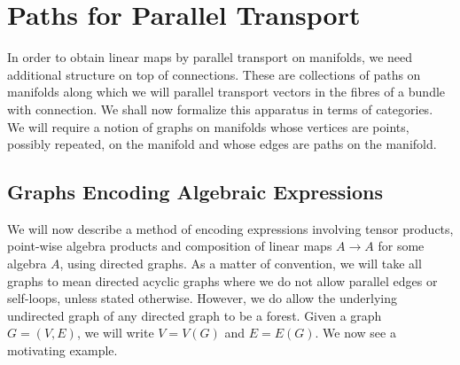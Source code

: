 \documentclass{amsart}
\renewcommand{\to}[1][]{\stackrel{#1}{\longrightarrow}}
\numberwithin{thm}{section}
\theoremstyle{definition}
\begin{document}
%

\section{Paths for Parallel Transport}

In order to obtain linear maps by parallel transport on manifolds, we need
additional structure on top of connections. These are collections of paths on
manifolds along which we will parallel transport vectors in the fibres of a
bundle with connection. We shall now formalize this apparatus in terms of
categories. We will require a notion of graphs on manifolds whose vertices are
points, possibly repeated, on the manifold and whose edges are paths on the
manifold.

%

\subsection{Graphs Encoding Algebraic Expressions}\label{subsec:alg_graph_exp}

We will now describe a method of encoding expressions involving tensor products,
point-wise algebra products and composition of linear maps $A \to A$ for some
algebra $A$, using directed graphs. As a matter of convention, we will take all
graphs to mean directed acyclic graphs where we do not allow parallel edges or
self-loops, unless stated otherwise. However, we do allow the underlying
undirected graph of any directed graph to be a forest. Given a graph
$G = (V, E)$, we will write $V = V(G)$ and $E = E(G)$. We now see a motivating
example.
\end{document}
